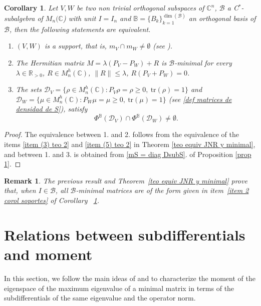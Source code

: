 \documentclass[12pt,a4paper]{article}
\def\calB{\mathcal B}
\def\calD{\mathcal D}
\def\R{\mathbb R}
\def\C{\mathbb C}
\def\tr{\text{tr}}
\newtheorem{corollary}{Corollary}
\newtheorem{remark}{Remark}
\numberwithin{equation}{section}
\begin{document}
 
	\begin{corollary}\label{coro: equival def soporte}
		Let $V, W$ be two non trivial orthogonal subspaces of $\C^n$, $\mathcal{B}$ a C$^*$-subalgebra of $M_n(\C$) with unit $I=I_n$ and $\mathbb{B}=\{B_k\}_{k=1}^{\dim(\calB)}$ an orthogonal basis of $\calB$,
		then the following statements are equivalent.
		\begin{enumerate}
			\item $(V,W)$ is a support, that is, $m_V\cap m_W\neq \emptyset$ (see \cite{soportes}).
			\item \label{item 2 corol soportes} The Hermitian matrix $M=\lambda (P_V-P_W)+R$ is $\mathcal{B}$-minimal  for every $\lambda\in\R_{>0}$, $R\in M_n^h(\C)$, $\|R\|\leq \lambda$, $R(P_V +P_W)=0$.
 
			\item The sets 	
			$
			\mathcal{D}_V=\{\rho\in M_n^h(\C):P_V \rho=\rho\geq 0,\ \tr(\rho)=1\}$ and $\mathcal{D}_W=\{\mu\in M_n^h(\C): P_W \mu=\mu\geq 0,\ \tr(\mu)=1\}$ (see \eqref{def matrices de densidad de S}), 
			satisfy  
			$$
			\Phi^\mathbb{B}(\calD_V)\cap\Phi^{\mathbb{B}}(\calD_W)\neq\emptyset .
			$$
		\end{enumerate}
	\end{corollary}
\begin{proof} The equivalence between 1. and 2. follows from the equivalence of the items \ref{item (3) teo 2} and \ref{item (5) teo 2} in Theorem \ref{teo equiv JNR y minimal}, and between 1. and 3. is obtained from \ref{mS = diag DsubS}. of Proposition \ref{prop 1}.
\end{proof}

  \begin{remark}
  The previous result and Theorem~\ref{teo equiv JNR y minimal} prove that, when $I\in\calB$, all $\calB$-minimal matrices are of the form given in item~\ref{item 2 corol soportes} of Corollary~ \ref{coro: equival def soporte}. 	
  \end{remark}
 
\section{Relations between subdifferentials and moment} \label{section subdiff and moment}
In this section, we follow the main ideas of \cite{overton2} and \cite{BV-SDP} to characterize the moment of the eigenspace of the maximum eigenvalue of a minimal matrix in terms of the subdifferentials of the same eigenvalue and the operator norm.
\end{document}
